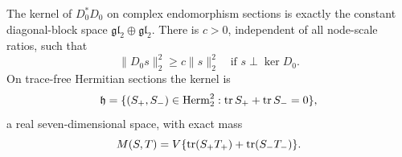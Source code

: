\begin{proposition}\label{prop:split-gap}
The kernel of $D_0^*D_0$ on complex endomorphism sections is
exactly the constant diagonal-block space
$\mathfrak{gl}_2\oplus\mathfrak{gl}_2$. There is $c>0$,
independent of all node-scale ratios, such that
\begin{equation}\label{eq:split-section-gap}
 \|D_0s\|_2^2\ge c\|s\|_2^2
 \quad\text{if }s\perp\ker D_0.
\end{equation}
On trace-free Hermitian sections the kernel is
\begin{equation}\label{eq:seven-space}
 \mathfrak h=\{(S_+,S_-)\in\operatorname{Herm}_2^2:
                             \operatorname{tr} S_++\operatorname{tr} S_-=0\},
\end{equation}
a real seven-dimensional space, with exact mass
\begin{equation}\label{eq:split-mass}
 M(S,T)=V\{\operatorname{tr}(S_+T_+)+\operatorname{tr}(S_-T_-)\}.
\end{equation}
\end{proposition}

